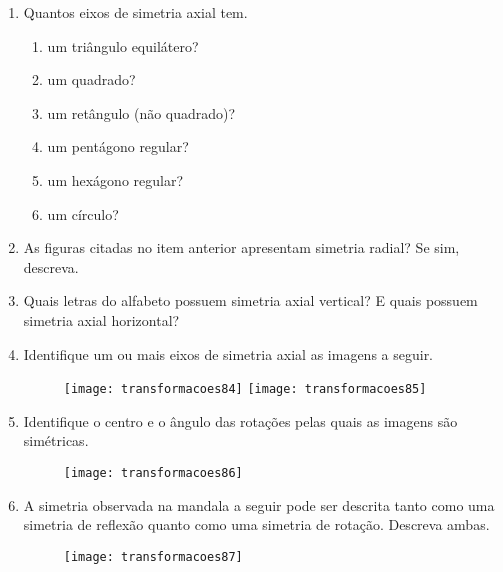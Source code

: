 \exercise

\begin{enumerate}
\item Quantos eixos de simetria axial tem.
\begin{enumerate}
\item um triângulo equilátero?
\item um quadrado?
\item um retângulo (não quadrado)?
\item um pentágono regular?
\item um hexágono regular?
\item um círculo?
\end{enumerate}


\item As figuras citadas no item anterior apresentam simetria radial? Se sim, descreva.

\item Quais letras do alfabeto possuem simetria axial vertical? E quais possuem simetria axial horizontal?

\item Identifique um ou mais eixos de simetria axial as imagens a seguir. 

\begin{figure}[H]
\centering

\texttt{[image: transformacoes84]}
\hspace{2em}
\texttt{[image: transformacoes85]}
\end{figure}

\item Identifique o centro e o ângulo das rotações pelas quais as imagens são simétricas. 

\begin{figure}[H]
\centering

\texttt{[image: transformacoes86]}
\hspace{2em}
\end{figure}

\item A simetria observada na mandala a seguir pode ser descrita tanto como uma simetria de reflexão quanto como uma simetria de rotação.  Descreva ambas.

\begin{figure}[H]
\centering

\texttt{[image: transformacoes87]}
\end{figure}


\end{enumerate}
